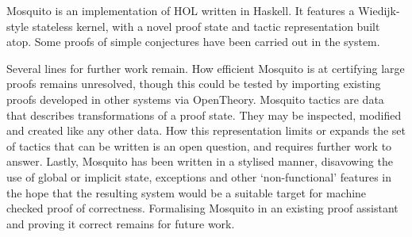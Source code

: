 \documentclass{llncs}
\newcommand{\mosquito}{Mosquito\xspace}
\begin{document}
\mosquito is an implementation of HOL written in Haskell.
It features a Wiedijk-style stateless kernel, with a novel proof state and tactic representation built atop.
Some proofs of simple conjectures have been carried out in the system.

Several lines for further work remain.
How efficient \mosquito is at certifying large proofs remains unresolved, though this could be tested by importing existing proofs developed in other systems via OpenTheory.
\mosquito tactics are data that describes transformations of a proof state.
They may be inspected, modified and created like any other data.
How this representation limits or expands the set of tactics that can be written is an open question, and requires further work to answer.
Lastly, \mosquito has been written in a stylised manner, disavowing the use of global or implicit state, exceptions and other `non-functional' features in the hope that the resulting system would be a suitable target for machine checked proof of correctness.
Formalising \mosquito in an existing proof assistant and proving it correct remains for future work.


\end{document}
